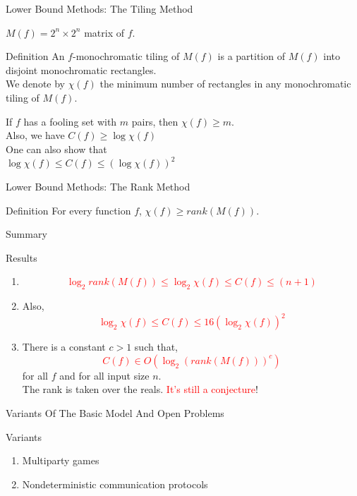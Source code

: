 \documentclass[9pt]{beamer}
\begin{document}
\begin{frame}{Lower Bound Methods: The Tiling Method}
  \pause
  \begin{block}{}
    $M(f)=2^n\times 2^n$ matrix of $f$.
  \end{block}
  \pause
  \begin{block}{Definition}
    An $f$-monochromatic tiling of $M(f)$ is a partition of $M(f)$ into disjoint 
    monochromatic rectangles. \\
    We denote by $\chi(f)$ the minimum number of rectangles in any monochromatic 
    tiling of $M(f)$.
  \end{block}
  \pause
  \begin{theorem}
    If $f$ has a fooling set with $m$ pairs, then $\chi(f)\geq m$. \\
    \pause
    Also, we have $C(f)\geq\log\chi(f)$\\
    \pause
    One can also show that \\
    $\log\chi(f)\leq C(f)\leq(\log\chi(f))^2$
  \end{theorem}
\end{frame}

\begin{frame}{Lower Bound Methods: The Rank Method}
  \begin{block}{Definition}
    For every function $f$, $\chi(f)\geq rank(M(f))$. 
  \end{block}
\end{frame}

\begin{frame}{Summary}
  \begin{block}{Results}
    \begin{enumerate}
    \item
      \textcolor{red}{$$ \log_2 rank(M(f))\leq \log_2\chi(f)\leq C(f)\leq (n+1)$$}
      \pause
    \item
      Also, \textcolor{red}{$$\log_2\chi(f)\leq C(f)\leq 16(\log_2\chi(f))^2$$}
      \pause
    \item
      There is a constant $c>1$ such that,
      \textcolor{red}{$$C(f)\in O(\log_2 (rank(M(f)))^c)$$} for all $f$ and for 
      all input size $n$. \\
      The rank is taken over the reals.
      \pause
      \textcolor{red}{It's still a conjecture}!
    \end{enumerate}
  \end{block}
\end{frame}

\begin{frame}{Variants Of The Basic Model And Open Problems} 
  \begin{block}{Variants}
    \begin{enumerate}
    \item Multiparty games
      \pause
    \item Nondeterministic communication protocols
    \end{enumerate}
  \end{block}
  
\end{frame}
\end{document}
